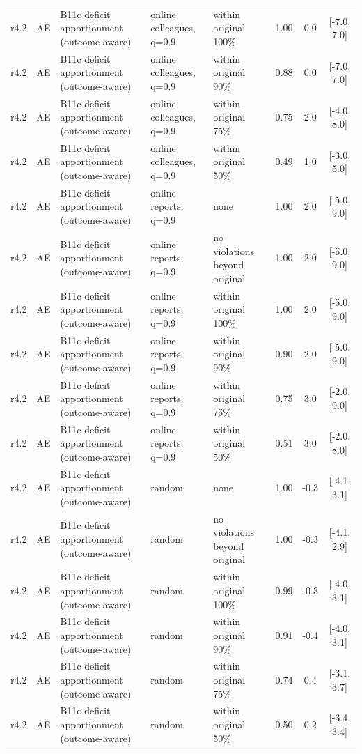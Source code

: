 \documentclass[10pt,onecolumn,letterpaper]{article}
\begin{document}
\begin{longtable}{lllp{4.2cm}p{3.4cm}ccc}
r4.2 & AE & B11c deficit apportionment (outcome-aware) & online colleagues, q=0.9 & within original 100\% & 1.00 & 0.0 & [-7.0, 7.0] \\
r4.2 & AE & B11c deficit apportionment (outcome-aware) & online colleagues, q=0.9 & within original 90\% & 0.88 & 0.0 & [-7.0, 7.0] \\
r4.2 & AE & B11c deficit apportionment (outcome-aware) & online colleagues, q=0.9 & within original 75\% & 0.75 & 2.0 & [-4.0, 8.0] \\
r4.2 & AE & B11c deficit apportionment (outcome-aware) & online colleagues, q=0.9 & within original 50\% & 0.49 & 1.0 & [-3.0, 5.0] \\
r4.2 & AE & B11c deficit apportionment (outcome-aware) & online reports, q=0.9 & none & 1.00 & 2.0 & [-5.0, 9.0] \\
r4.2 & AE & B11c deficit apportionment (outcome-aware) & online reports, q=0.9 & no violations beyond original & 1.00 & 2.0 & [-5.0, 9.0] \\
r4.2 & AE & B11c deficit apportionment (outcome-aware) & online reports, q=0.9 & within original 100\% & 1.00 & 2.0 & [-5.0, 9.0] \\
r4.2 & AE & B11c deficit apportionment (outcome-aware) & online reports, q=0.9 & within original 90\% & 0.90 & 2.0 & [-5.0, 9.0] \\
r4.2 & AE & B11c deficit apportionment (outcome-aware) & online reports, q=0.9 & within original 75\% & 0.75 & 3.0 & [-2.0, 9.0] \\
r4.2 & AE & B11c deficit apportionment (outcome-aware) & online reports, q=0.9 & within original 50\% & 0.51 & 3.0 & [-2.0, 8.0] \\
r4.2 & AE & B11c deficit apportionment (outcome-aware) & random & none & 1.00 & -0.3 & [-4.1, 3.1] \\
r4.2 & AE & B11c deficit apportionment (outcome-aware) & random & no violations beyond original & 1.00 & -0.3 & [-4.1, 2.9] \\
r4.2 & AE & B11c deficit apportionment (outcome-aware) & random & within original 100\% & 0.99 & -0.3 & [-4.0, 3.1] \\
r4.2 & AE & B11c deficit apportionment (outcome-aware) & random & within original 90\% & 0.91 & -0.4 & [-4.0, 3.1] \\
r4.2 & AE & B11c deficit apportionment (outcome-aware) & random & within original 75\% & 0.74 & 0.4 & [-3.1, 3.7] \\
r4.2 & AE & B11c deficit apportionment (outcome-aware) & random & within original 50\% & 0.50 & 0.2 & [-3.4, 3.4] \\

\end{longtable}
\end{document}
